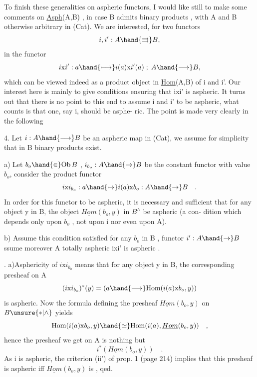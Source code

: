 
To finish these generalities on aspheric functors, I would like still
to make some comments on \uline{Asph}(A,B) , in case B admits binary products ,
with A and B otherwise arbitrary in (Cat). We are interested, for two
functors
\[ i,i' : A \hand{\rightrightarrows} B , \]
in the functor
\[ i\mathrm{x} i' : a \hand{\longmapsto} i(a)\mathrm{x} i'(a) \; ; \; A \hand{\longrightarrow} B , \]
which can be viewed indeed as a product object in \uline{Hom}(A,B) of i and i'.
Our interest here is mainly to give conditions ensuring that ixi' is
aspheric. It turns out that there is no point to this end to assume \hand{\uline{\textcolor{black}{both}}}
i and i' to be aspheric, what counts is that one, say i, should be asphe-%
ric. The point is made very clearly in the following

\hand{\uline{\textcolor{black}{Proposition}}} 4. Let $i: A \hand{\longrightarrow} B$ be an aspheric 
map in (Cat), we assume for simplicity that in B binary products exist.

a) Let $b_o \hand{\in} \mathrm{Ob}\, B$ , $i_{b_o} : A \hand{\to} B$ be the constant functor with value $b_o$,
consider the product functor
\[ i\mathrm{x} i_{b_o} : a \hand{\mapsto} i(a)\mathrm{x} b_o : A \hand{\to} B \quad . \]
In order for this functor to be aspheric, it is necessary and sufficient
that for any object y in B, the object $\underline{Hom}(b_o,y)$ in $B^\wedge$ be aspheric (a con-%
dition which depends only upon $b_o$ , not upon i nor even upon A).

b) Assume this condition satisfied for any $b_o$ in B ,  
\hand{\uline{\textcolor{black}{any}}} functor $i': A \hand{\to} B$ \hand{,} \hand{(}ssume moreover A totally aspheric\hand{)}\hand{$\nwarrow$} 
ixi' is aspheric  .

\hand{\uline{\textcolor{black}{Proof}}}. a)Asphericity of $i\mathrm{x} i_{b_o}$ means that for any object y in B, the
corresponding  presheaf on A
\[ (i\mathrm{x} i_{b_o})^*(y) = ( a \hand{\longmapsto} \mathrm{Hom}(i(a)\mathrm{x} b_o,y)) \]
is aspheric. Now the formula defining the presheaf $\underline{Hom}(b_o,y)$ on $B\unsure{*|\wedge}$
yields
\[ \mathrm{Hom}(i(a)\mathrm{x} b_o,y) \hand{\simeq} \mathrm{Hom}(i(a), \underline{Hom}(b_o,y)) \quad , \]
hence the presheaf we get on A is nothing but
\[ i^*(\underline{Hom}(b_o,y)) \quad . \]
As i is aspheric, the criterion (ii') of prop. 1 (page 214) implies that
this presheaf is aspheric iff $\underline{Hom}(b_o,y)$ is , qed.

